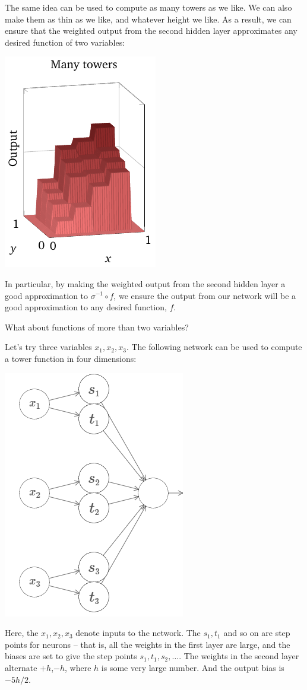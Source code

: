 \documentclass[a4paper,twoside,10pt]{book}
\begin{document}
The same idea can be used to compute as many towers as we like. We can also make them as thin as we like, and whatever height we like. As a result, we can ensure that the weighted output from the second hidden layer approximates any desired function of two variables:
\begin{center}
\includegraphics[width=0.32\linewidth]{figures/ch4/3d/manytowers2}
\end{center}
In particular, by making the weighted output from the second hidden layer a good approximation to $\sigma^{-1}\circ f$, we ensure the output from our network will be a good approximation to any desired function, $f$.

What about functions of more than two variables?

Let's try three variables $x_1,x_2,x_3$. The following network can be used to compute a tower function in four dimensions:
\begin{center}
\includegraphics[width=0.35\linewidth]{figures/ch4/tikz441}
\end{center}
Here, the $x_1,x_2,x_3$ denote inputs to the network. The $s_1,t_1$ and so on are step points for neurons -- that is, all the weights in the first layer are large, and the biases are set to give the step points $s_1,t_1,s_2,\ldots$. The weights in the second layer alternate $+h$,$-h$, where $h$ is some very large number. And the output bias is $-5h/2$.
\end{document}
